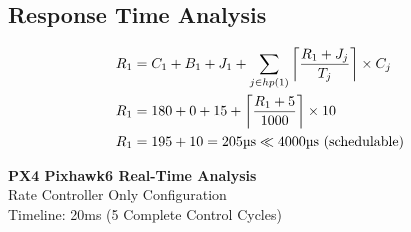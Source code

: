 \documentclass[landscape,a4paper]{article}
\begin{document}
\subsection{Response Time Analysis}
\begin{align}
R_1 &= C_1 + B_1 + J_1 + \sum_{j \in hp(1)} \left\lceil \frac{R_1 + J_j}{T_j} \right\rceil \times C_j\\
R_1 &= 180 + 0 + 15 + \left\lceil \frac{R_1 + 5}{1000} \right\rceil \times 10\\
R_1 &= 195 + 10 = 205\text{\textmu s} \ll 4000\text{\textmu s} \text{ (schedulable)}
\end{align}

\begin{center}
\begin{tcolorbox}[colback=px4darkblue!5,colframe=px4darkblue,width=\textwidth,arc=3mm,boxrule=2pt]
\centering
{\Huge\color{px4darkblue}\textbf{PX4 Pixhawk6 Real-Time Analysis}}\\[0.5cm]
{\Large\color{px4blue}Rate Controller Only Configuration}\\[0.3cm]
{\large Timeline: 20ms (5 Complete Control Cycles)}
\end{tcolorbox}
\end{center}

\vspace{0.5cm}
\end{document}
